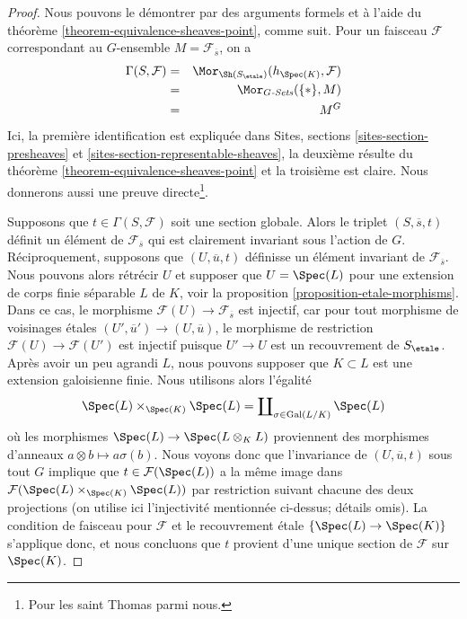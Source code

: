 \begin{proof}
Nous pouvons le d\'emontrer par des arguments formels et \`a l'aide du
th\'eor\`eme \ref{theorem-equivalence-sheaves-point},
comme suit. Pour un faisceau $\mathcal{F}$ correspondant au
$G$-ensemble $M = \mathcal{F}_{\overline{s}}$, on a
\begin{eqnarray*}
\Gamma(S, \mathcal{F}) & = &
\Mor_{\Sh(S_\etale)}(h_{\Spec(K)},  \mathcal{F})
\\
& = & \Mor_{G\textit{-Sets}}(\{*\}, M) \\
& = & M^G
\end{eqnarray*}
Ici, la premi\`ere identification est expliqu\'ee dans
Sites, sections \ref{sites-section-presheaves} et
\ref{sites-section-representable-sheaves},
la deuxi\`eme r\'esulte du
th\'eor\`eme \ref{theorem-equivalence-sheaves-point}
et la troisi\`eme est claire. Nous donnerons aussi une preuve directe\footnote{Pour
les saint Thomas parmi nous.}.

\medskip\noindent
Supposons que $t \in \Gamma(S, \mathcal{F})$ soit une section globale.
Alors le triplet $(S, \overline{s}, t)$ d\'efinit un \'el\'ement de
$\mathcal{F}_{\overline{s}}$ qui est clairement invariant sous
l'action de $G$. R\'eciproquement, supposons que $(U, \overline{u}, t)$
d\'efinisse un \'el\'ement invariant de $\mathcal{F}_{\overline{s}}$.
Nous pouvons alors r\'etr\'ecir $U$ et supposer que $U = \Spec(L)$ pour une
extension de corps finie s\'eparable $L$ de $K$, voir la
proposition \ref{proposition-etale-morphisms}.
Dans ce cas, le morphisme $\mathcal{F}(U) \to \mathcal{F}_{\overline{s}}$
est injectif, car pour tout morphisme de voisinages \'etales
$(U', \overline{u}') \to (U, \overline{u})$, le morphisme de restriction
$\mathcal{F}(U) \to \mathcal{F}(U')$ est injectif puisque $U' \to U$
est un recouvrement de $S_\etale$.
Apr\`es avoir un peu agrandi $L$, nous pouvons supposer que $K \subset L$ est une extension
galoisienne finie. Nous utilisons alors l'\'egalit\'e
$$
\Spec(L) \times_{\Spec(K)} \Spec(L)
=
\coprod\nolimits_{\sigma \in \text{Gal}(L/K)} \Spec(L)
$$
o\`u les morphismes $\Spec(L) \to \Spec(L \otimes_K L)$
proviennent des morphismes d'anneaux $a \otimes b \mapsto a\sigma(b)$. Nous
voyons donc que l'invariance de $(U, \overline{u}, t)$
sous tout $G$ implique que $t \in \mathcal{F}(\Spec(L))$
a la m\^eme image dans
$\mathcal{F}(\Spec(L) \times_{\Spec(K)} \Spec(L))$
par restriction suivant chacune des deux projections (on utilise ici l'injectivit\'e mentionn\'ee
ci-dessus; d\'etails omis). La condition de faisceau pour $\mathcal{F}$
et le recouvrement \'etale $\{\Spec(L) \to \Spec(K)\}$ s'applique
donc, et nous concluons que $t$ provient d'une unique section de $\mathcal{F}$
sur $\Spec(K)$.
\end{proof}

